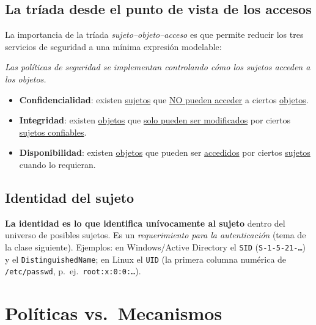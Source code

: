 \documentclass[11pt,a4paper]{article}
\begin{document}
\subsection{La tríada desde el punto de vista de los accesos}
La importancia de la tríada \emph{sujeto–objeto–acceso} es que permite reducir los tres
servicios de seguridad a una mínima expresión modelable:

\begin{slidebox}
\centering\itshape Las políticas de seguridad se implementan controlando cómo los sujetos
acceden a los objetos.
\end{slidebox}

\begin{itemize}[leftmargin=1.5em,itemsep=2pt]
  \item \textbf{Confidencialidad}: existen \underline{sujetos} que \underline{NO pueden
        acceder} a ciertos \underline{objetos}.
  \item \textbf{Integridad}: existen \underline{objetos} que \underline{solo pueden ser
        modificados} por ciertos \underline{sujetos confiables}.
  \item \textbf{Disponibilidad}: existen \underline{objetos} que pueden ser
        \underline{accedidos} por ciertos \underline{sujetos} cuando lo requieran.
\end{itemize}

\subsection{Identidad del sujeto}
\textbf{La identidad es lo que identifica unívocamente al sujeto} dentro del universo de
posibles sujetos. Es un \emph{requerimiento para la autenticación} (tema de la clase
siguiente). Ejemplos: en Windows/Active Directory el \texttt{SID}
(\texttt{S-1-5-21-\dots}) y el \texttt{DistinguishedName}; en Linux el \texttt{UID} (la
primera columna numérica de \texttt{/etc/passwd}, p.\ ej.\ \texttt{root:x:0:0:\dots}).

\section{Políticas vs.\ Mecanismos}
\end{document}

